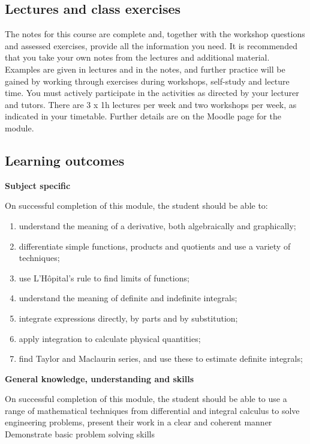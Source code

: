 \documentclass[12pt]{article}
\theoremstyle{definition}
\newcounter{ex}\renewcommand\theex{\arabic{ex}}
\begin{document}
\subsection{Lectures and class exercises}


The notes for this course are complete and, together with the workshop
questions and assessed exercises, provide all the information you
need. It is recommended that you take your own notes from the lectures
and additional material. 
Examples are given in lectures and in the notes, and further practice
will be gained by working through exercises during workshops,
self-study and lecture time. 
You must actively participate in the
activities as directed by your lecturer and tutors.
There are 3 x 1h lectures per week and two workshops per week, as
indicated in your timetable. Further details are on the Moodle page
for the module.


\subsection{Learning outcomes}

{\bf Subject specific}

On successful completion of this module, the student should be able
to: 

\begin{enumerate}
\item understand the meaning of a derivative, both algebraically and
graphically; 
\item differentiate simple functions, products and quotients
and use a variety of techniques; 
\item use L'H\^opital's rule to find limits of functions;
\item understand the meaning of definite and indefinite integrals;
\item integrate expressions directly, by parts and by substitution; 
\item apply integration to calculate physical quantities; 
\item find Taylor and Maclaurin series, and use these to estimate 
definite integrals;
\end{enumerate}

\vspace{.3cm}
{\bf General knowledge, understanding and skills}

On successful completion of this module, the student should be able to
use a range of mathematical techniques from differential and integral
calculus to solve engineering problems, 
present their work in a clear and coherent manner
Demonstrate basic problem solving skills 
\end{document}
